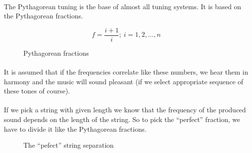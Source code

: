 \documentclass[]{article}
\begin{document}
            \paragraph{} The Pythagorean tuning\cite{pythtun} is the base of almost all tuning systems. It is based on the Pythagorean fractions.\\
                \begin{figure}[h]
                    $$f = \frac{i + 1}{i} ;\ i = 1, 2, ..., n$$
                    \caption{Pythagorean fractions}
                \end{figure}\paragraph{}
                It is assumed that if the frequencies correlate like these numbers, we hear them in harmony and the music will sound pleasant (if we select appropriate sequence of these tones of course).\paragraph{}
                If we pick a string with given length we know that the frequency of the produced sound depends on the length of the string. So to pick the ``perfect'' fraction, we have to divide it like the Pythagorean fractions.
                \begin{figure}[h]
                    \begin{center}
                        \caption{The ``pefect'' string separation}            
                    \end{center}
                \end{figure}
\end{document}
